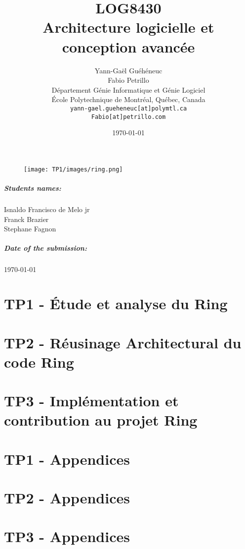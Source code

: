 \documentclass[11pt]{report}
\title{LOG8430\\Architecture logicielle et conception avanc\'{e}e}
\author{
    Yann-Gaël Guéhéneuc \\
    Fabio Petrillo \\
    D\'{e}partement G\'{e}nie Informatique et G\'{e}nie Logiciel \\
    \'{E}cole Polytechnique de Montr\'{e}al, Qu\'{e}bec, Canada \\
    \texttt{yann-gael.gueheneuc[at]polymtl.ca} \\
    \texttt{Fabio[at]petrillo.com}
}
\date{\today}
\def\auteur{}
\begin{document}
{\let\newpage\relax\maketitle}
\begin{figure}[ht!]
\centering
\texttt{[image: TP1/images/ring.png]}
\end{figure}

\paragraph{Students names:}
\centering
\paragraph{} \auteur
Isnaldo Francisco de Melo jr\\
Franck Brazier\\
Stephane Fagnon\\

\centering

\paragraph{Date of the submission:}
\today
\newpage

\tableofcontents

\raggedright
\chapter{TP1 - Étude et analyse du Ring }

\newpage
\chapter{TP2 - Réusinage Architectural du code Ring}

\newpage
\chapter{TP3 - Implémentation et contribution au projet Ring }



\appendix
\chapter{TP1 - Appendices}

\chapter{TP2 - Appendices}

\chapter{TP3 - Appendices}



\printbibliography
\end{document}
